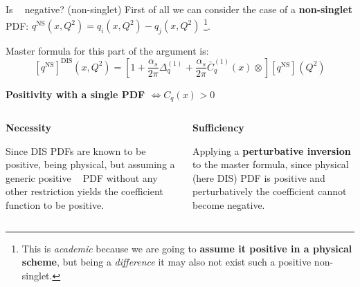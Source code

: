 \documentclass[8pt]{beamer}
\DeclareMathOperator{\msbar}{\overline{MS}}
\begin{document}
\begin{frame}{Is $\msbar$ negative? (non-singlet)}
    First of all we can consider the case of a \textbf{non-singlet} PDF:
    $q^{\text{NS}}(x, Q^2) = q_i(x, Q^2) - q_j(x, Q^2)$
    \footnote{This is \textit{academic} because we are going to \textbf{assume
    it positive in a physical scheme}, but being a \textit{difference} it may
    also not exist such a positive non-singlet.}.

    \vspace*{10pt}
    Master formula for this part of the argument is:
    \begin{equation*}
        \left[{q^{\text{NS}}}\right]^{\text{DIS}}(x,Q^2)=
        \left[1+\frac{\alpha_s}{2\pi} {\Delta^{(1)}_q}^{\msbar}
        +\frac{\alpha_s}{2\pi}  {\bar
        C^{(1)}_q(x)}^{\msbar}\otimes\right]\left[{q^{\text{NS}}}\right]^{\msbar}(Q^2)
    \end{equation*}

    \vspace*{20pt}
    \textbf{\large Positivity with a single PDF $\iff C_q(x)^{\msbar} > 0$}
    \vspace*{14pt}

    \begin{columns}
        \begin{column}{0.5\textwidth}
            \textbf{Necessity}
            \newline

            Since DIS PDFs are known to be positive, being physical, but
            assuming a generic positive $\msbar$ PDF without any other
            restriction yields the coefficient function to be
            positive\footnotemark.
        \end{column}
        \begin{column}{0.5\textwidth}
            \textbf{Sufficiency}
            \newline

            Applying a \textbf{perturbative inversion} to the master formula,
            since physical (here $\text{DIS}$) PDF is
            positive and perturbatively the coefficient
            cannot become negative\footnotemark.\\
        \end{column}
    \end{columns}
\end{frame}
\end{document}
